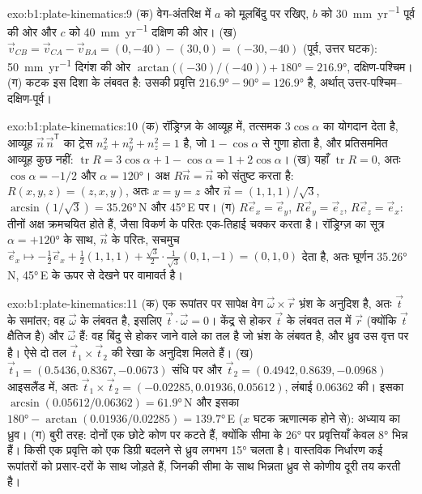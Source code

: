\begin{solution}{exo:b1:plate-kinematics:9}
(क) वेग-अंतरिक्ष में $a$ को मूलबिंदु पर रखिए, $b$ को \qty{30}{mm.yr^{-1}} पूर्व की ओर और $c$ को \qty{40}{mm.yr^{-1}} दक्षिण की ओर। (ख) $\vec v_{CB} =
\vec v_{CA} - \vec v_{BA} = (0, -40) - (30, 0) = (-30, -40)$ (पूर्व, उत्तर घटक):
\qty{50}{mm.yr^{-1}} दिगंश की ओर
$\arctan\bigl((-30)/(-40)\bigr) + \ang{180} = \ang{216.9}$, दक्षिण-पश्चिम। (ग) कटक इस दिशा के लंबवत है: उसकी प्रवृत्ति $\ang{216.9} - \ang{90} = \ang{126.9}$ है, अर्थात् उत्तर-पश्चिम–दक्षिण-पूर्व।
\end{solution}

\begin{solution}{exo:b1:plate-kinematics:10}
(क) रॉड्रिग्ज़ के आव्यूह में, तत्समक $3\cos\alpha$ का योगदान देता है, आव्यूह
$\vec n\,\vec n^{\mathsf T}$ का ट्रेस $n_x^2 + n_y^2 + n_z^2 = 1$ है, जो $1 - \cos\alpha$ से गुणा होता है, और प्रतिसममित आव्यूह कुछ नहीं: $\operatorname{tr}R =
3\cos\alpha + 1 - \cos\alpha = 1 + 2\cos\alpha$। (ख) यहाँ $\operatorname{tr}R = 0$,
अतः $\cos\alpha = -1/2$ और $\alpha = \ang{120}$। अक्ष $R\vec n =
\vec n$ को संतुष्ट करता है: $R(x, y, z) = (z, x, y)$, अतः $x = y = z$ और $\vec n =
(1, 1, 1)/\sqrt3$,  $\arcsin(1/\sqrt3) = \ang{35.26}$\,N और
 \ang{45}\,E पर। (ग) $R\vec e_x = \vec e_y$, $R\vec e_y = \vec e_z$,
$R\vec e_z = \vec e_x$: तीनों अक्ष क्रमचयित होते हैं, जैसा विकर्ण के परितः एक-तिहाई चक्कर करता है। रॉड्रिग्ज़ का सूत्र $\alpha = +\ang{120}$ के साथ, $\vec n$ के परितः, सचमुच
$\vec e_x\mapsto -\tfrac12\vec e_x + \tfrac12(1, 1, 1) +
\tfrac{\sqrt3}{2}\cdot\tfrac{1}{\sqrt3}(0, 1, -1) = (0, 1, 0)$ देता है, अतः घूर्णन \ang{35.26}\,N, \ang{45}\,E के ऊपर से देखने पर वामावर्त है।
\end{solution}

\begin{solution}{exo:b1:plate-kinematics:11}
(क) एक रूपांतर पर सापेक्ष वेग $\vec\omega\times\vec r$ भ्रंश के अनुदिश है, अतः $\vec t$ के समांतर; वह $\vec\omega$ के लंबवत है, इसलिए
$\vec t\cdot\vec\omega = 0$। केंद्र से होकर $\vec t$ के लंबवत तल में $\vec r$ (क्योंकि $\vec t$ क्षैतिज है) और $\vec\omega$ हैं: वह बिंदु से होकर जाने वाले  का तल है जो भ्रंश के लंबवत है, और ध्रुव उस वृत्त पर है। ऐसे दो तल $\vec t_1\times\vec t_2$ की रेखा के अनुदिश मिलते हैं। (ख) $\vec t_1 = (0.5436, 0.8367, -0.0673)$ संधि पर और $\vec t_2 = (0.4942, 0.8639, -0.0968)$ आइसलैंड में, अतः
$\vec t_1\times\vec t_2 = (-0.02285, 0.01936, 0.05612)$, लंबाई $0.06362$ की। इसका  $\arcsin(0.05612/0.06362) = \ang{61.9}$\,N और इसका 
$\ang{180} - \arctan(0.01936/0.02285) = \ang{139.7}$\,E ($x$ घटक ऋणात्मक होने से): अध्याय का ध्रुव। (ग) बुरी तरह: दोनों  एक छोटे कोण पर कटते हैं, क्योंकि सीमा के \ang{26} पर प्रवृत्तियाँ केवल \ang{8} भिन्न हैं। किसी एक प्रवृत्ति को एक डिग्री बदलने से ध्रुव लगभग \ang{15} चलता है। वास्तविक निर्धारण कई रूपांतरों को प्रसार-दरों के साथ जोड़ते हैं, जिनकी सीमा के साथ भिन्नता ध्रुव से कोणीय दूरी तय करती है।
\end{solution}

